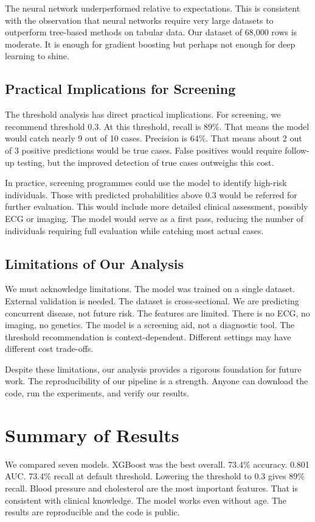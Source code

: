 \documentclass[12pt, a4paper, oneside]{book}
\begin{document}
The neural network underperformed relative to expectations. This is consistent with the observation that neural networks require very large datasets to outperform tree-based methods on tabular data. Our dataset of 68,000 rows is moderate. It is enough for gradient boosting but perhaps not enough for deep learning to shine.

\subsection{Practical Implications for Screening}
The threshold analysis has direct practical implications. For screening, we recommend threshold 0.3. At this threshold, recall is 89\%. That means the model would catch nearly 9 out of 10 cases. Precision is 64\%. That means about 2 out of 3 positive predictions would be true cases. False positives would require follow-up testing, but the improved detection of true cases outweighs this cost.

In practice, screening programmes could use the model to identify high-risk individuals. Those with predicted probabilities above 0.3 would be referred for further evaluation. This would include more detailed clinical assessment, possibly ECG or imaging. The model would serve as a first pass, reducing the number of individuals requiring full evaluation while catching most actual cases.

\subsection{Limitations of Our Analysis}
We must acknowledge limitations. The model was trained on a single dataset. External validation is needed. The dataset is cross-sectional. We are predicting concurrent disease, not future risk. The features are limited. There is no ECG, no imaging, no genetics. The model is a screening aid, not a diagnostic tool. The threshold recommendation is context-dependent. Different settings may have different cost trade-offs.

Despite these limitations, our analysis provides a rigorous foundation for future work. The reproducibility of our pipeline is a strength. Anyone can download the code, run the experiments, and verify our results.

\section{Summary of Results}
We compared seven models. XGBoost was the best overall. 73.4\% accuracy. 0.801 AUC. 73.4\% recall at default threshold. Lowering the threshold to 0.3 gives 89\% recall. Blood pressure and cholesterol are the most important features. That is consistent with clinical knowledge. The model works even without age. The results are reproducible and the code is public.
\end{document}
